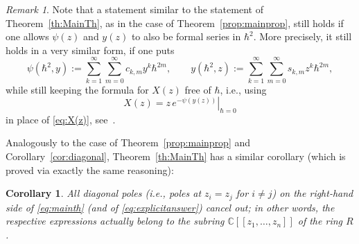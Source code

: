 \documentclass[11pt]{article}
\newcommand{\ie}{i.e.,\xspace}
\newcommand{\llbracket}{[\![}
\newcommand{\rrbracket}{]\!]}
\theoremstyle{plain}
\newtheorem{corollary}[theorem]{Corollary}
\theoremstyle{definition}
\theoremstyle{remark}
\newtheorem{remark}[theorem]{Remark}
\begin{document}
\begin{remark} \label{rem:Hdeformed}
Note that a statement similar to the statement of Theorem~\ref{th:MainTh}, as in the case of Theorem~\ref{prop:mainprop}, still holds if one allows $\psi(z)$ and $y(z)$ to also be formal series in $\hbar^2$. More precisely, it still holds in a very similar form, if one puts
\[
\psi(\hbar^2,y):=\sum_{k=1}^\infty\sum_{m=0}^\infty c_{k,m} y^k\hbar^{2m},\qquad
y(\hbar^2,z):=\sum_{k=1}^\infty\sum_{m=0}^\infty s_{k,m} z^k\hbar^{2m},
\]
while still keeping the formula for $X(z)$ free of $\hbar$, \ie using
\begin{equation*}
X(z)=\left.z\,e^{-\psi(y(z))}\right|_{\hbar=0}
\end{equation*}
in place of \eqref{eq:X(z)}, see~\cite[\S 3]{BDKS21toprec}.
\end{remark}

Analogously to the case of Theorem~\ref{prop:mainprop} and Corollary~\ref{cor:diagonal}, Theorem~\ref{th:MainTh} has a similar corollary (which is proved via exactly the same reasoning):
\begin{corollary}\label{cor:Hdiag}
All diagonal poles (\ie poles at $z_i=z_j$ for $i\neq j$) on the right-hand side of \eqref{eq:mainth} (and of \eqref{eq:explicitanswer}) cancel out; in other words, the respec\-tive expressions actually belong to the subring $\mathbb{C}\llbracket z_1,\dots,z_n\rrbracket $ of the ring $R$.
\end{corollary}
\end{document}
